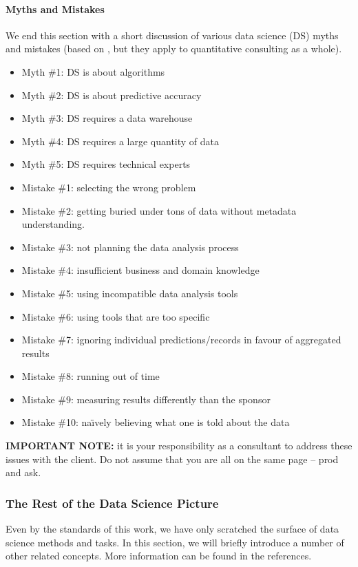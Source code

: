 \paragraph{Myths and Mistakes}
We end this section with a short discussion of various data science (DS) myths and mistakes (based on \cite{DSML_CL13}, but they apply to quantitative consulting as a whole).
\begin{itemize}[noitemsep]
\item Myth \#1: DS is about algorithms
\item Myth \#2: DS is about predictive accuracy
\item Myth \#3: DS requires a data warehouse
\item Myth \#4: DS requires a large quantity of data
\item Myth \#5: DS requires technical experts
\item Mistake \#1: selecting the wrong problem
\item Mistake \#2: getting buried under tons of data without metadata understanding.
\item Mistake \#3: not planning the data analysis process
\item Mistake \#4: insufficient business and domain knowledge
\item Mistake \#5: using incompatible data analysis tools
\item Mistake \#6: using tools that are too specific
\item Mistake \#7: ignoring individual predictions/records in favour of aggregated results
\item Mistake \#8: running out of time
\item Mistake \#9: measuring results differently than the sponsor
\item Mistake \#10: na\"{\i}vely believing what one is told about the data
\end{itemize}
\textbf{IMPORTANT NOTE:} it is your responsibility as a consultant to address these issues with the client. Do not assume that you are all on the same page -- prod and ask.  
\subsubsection{The Rest of the Data Science Picture}
Even by the standards of this work, we have only scratched the surface of data science methods and tasks. In this section, we will briefly introduce a number of other related concepts. More information can be found in the references. 
